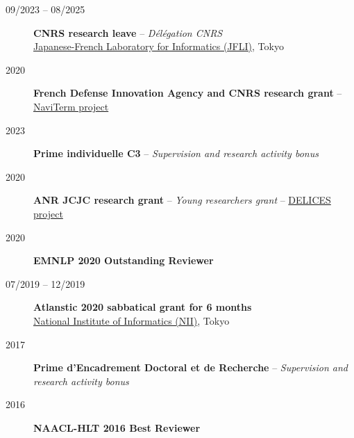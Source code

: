 \begin{description}

    \item[09/2023 -- 08/2025] \textbf{CNRS research leave} -- \emph{Délégation CNRS} \\
                                \href{https://jfli.cnrs.fr/}{Japanese-French Laboratory for Informatics (JFLI)}, Tokyo

    \item[2020] \textbf{French Defense Innovation Agency and CNRS research grant} -- \href{https://cnrs-naviterm.github.io/}{NaviTerm project}

    \item[2023] \textbf{Prime individuelle C3} -- \emph{Supervision and research activity bonus}

    \item[2020] \textbf{ANR JCJC research grant} -- \emph{Young researchers grant} -- \href{https://anr-delices.github.io/}{DELICES project} 

    \item[2020] \textbf{EMNLP 2020 Outstanding Reviewer}

    \item[07/2019 -- 12/2019] \textbf{Atlanstic 2020 sabbatical grant for 6 months} \\
    \href{https://www.nii.ac.jp/en/}{National Institute of Informatics (NII)}, Tokyo

    \item[2017] \textbf{Prime d'Encadrement Doctoral et de Recherche} -- \emph{Supervision and research activity bonus}

    \item[2016] \textbf{NAACL-HLT 2016 Best Reviewer}

\end{description}